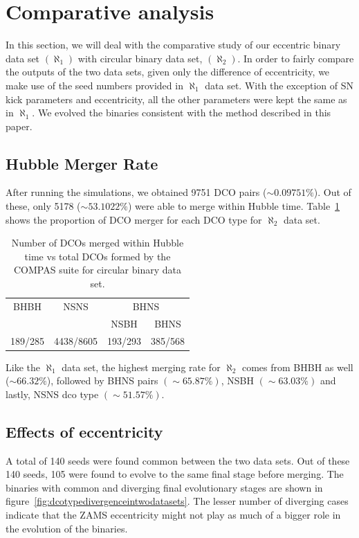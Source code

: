 \documentclass[journal, twocolumn]{IEEEtran}
\begin{document}
    \section{Comparative analysis}
    \label{sec:comparative-analysis}
    In this section, we will deal with the comparative study of our eccentric binary data set $(\aleph_1)$ with circular binary data set, $(\aleph_2)$.
    In order to fairly compare the outputs of the two data sets, given only the difference of eccentricity, we make use of the seed numbers provided in $\aleph_1$ data set.
    With the exception of SN kick parameters and eccentricity, all the other parameters were kept the same as in $\aleph_1$.
    We evolved the binaries consistent with the method described in this paper.
    
    \subsection{Hubble Merger Rate} 
    After running the simulations, we obtained 9751 DCO pairs ($\sim0.09751\%$). Out of these, only 5178 ($\sim53.1022\%$) were able to merge within Hubble time. Table~\ref{tab:dco_details0e} shows the proportion of DCO merger for each DCO type for $\aleph_2$ data set.
    
    \begin{table}[!h]%
		\centering
		\begin{tabular}{@{}cccc@{}}
			\toprule
			\multirow{2.5}{*}{BHBH} & \multirow{2.5}{*}{NSNS} & \multicolumn{2}{c}{BHNS} \\ \cmidrule(l){3-4}
			&           & NSBH    & BHNS     \\ \midrule
			189/285 & 4438/8605 & 193/293 & 385/568 \\ \bottomrule
		\end{tabular}%
		\caption{Number of DCOs merged within Hubble time vs total DCOs formed by the COMPAS suite for circular binary data set.}
		\label{tab:dco_details0e}
	\end{table}%
	Like the $\aleph_1$ data set, the highest merging rate for $\aleph_2$ comes from BHBH as well ($\sim66.32\%$), followed by BHNS pairs $(\sim65.87\%)$, NSBH $(\sim63.03\%)$ and lastly, NSNS dco type $(\sim51.57\%)$.

	\subsection{Effects of eccentricity}	
	A total of 140 seeds were found common between the two data sets.
    Out of these 140 seeds, 105 were found to evolve to the same final stage before merging. The binaries with common and diverging final evolutionary stages are shown in figure~\ref{fig:dcotypedivergenceintwodatasets}.
    The lesser number of diverging cases indicate that the ZAMS eccentricity might not play as much of a bigger role in the evolution of the binaries.
    
\end{document}
